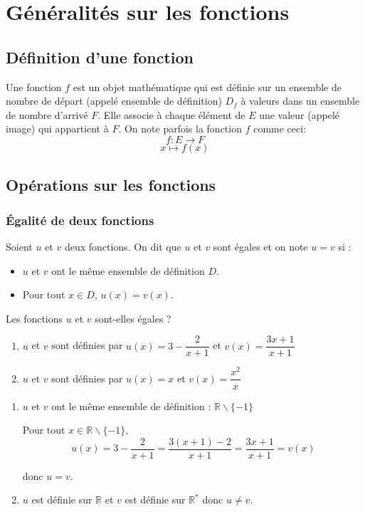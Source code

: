\documentclass[french]{book}
\newcommand{\R}{\mathbb {R}}
\begin{document}
\tableofcontents
\chapter{Généralités sur les fonctions}
\section{Définition d'une fonction}
\begin{defn}
Une fonction $f$ est un objet mathématique qui est définie sur un ensemble de nombre de départ (appelé ensemble de définition) $D_f$ à valeurs dans un ensemble de nombre d'arrivé $F$. Elle associe à chaque élément de $E$ une valeur (appelé image) qui appartient à $F$. On note parfois la fonction $f$  comme ceci:  
$$f : E \longrightarrow F $$
$$ x \mapsto f(x)$$
\end{defn}
\section{Opérations sur les fonctions}
\subsection{Égalité de deux fonctions}
\begin{defn}
Soient $u$ et $v$ deux fonctions. On dit que $u$ et $v$ sont égales et on note $u=v$ si :
\begin{itemize}
\item $u$ et $v$ ont le même ensemble de définition $D$.
\item Pour tout $x\in D$, $u(x)=v(x)$.
\end{itemize}
\end{defn}

\begin{exemple}
Les fonctions $u$ et $v$ sont-elles égales ?
\begin{enumerate}
\item $u$ et $v$ sont définies par $u(x)=3-\dfrac{2}{x+1}$ et $v(x)=\dfrac{3x+1}{x+1}$
\item $u$ et $v$ sont définies par $u(x)=x$ et $v(x)=\dfrac{x^{2}}{x}$
\end{enumerate}
\end{exemple}


\begin{enumerate}
\item $u$ et $v$ ont le même ensemble de définition : $\R \backslash \{ -1\}$

Pour tout $x\in \R \backslash \{ -1\}$, \[u(x)=3-\dfrac{2}{x+1}=\dfrac{3(x+1)-2}{x+1}=\dfrac{3x+1}{x+1}=v(x)\]

donc $u=v$.
\item $u$ est définie sur $\R$ et $v$ est définie sur $\R^{*}$ donc $u\neq v$.
\end{enumerate}
\end{document}
